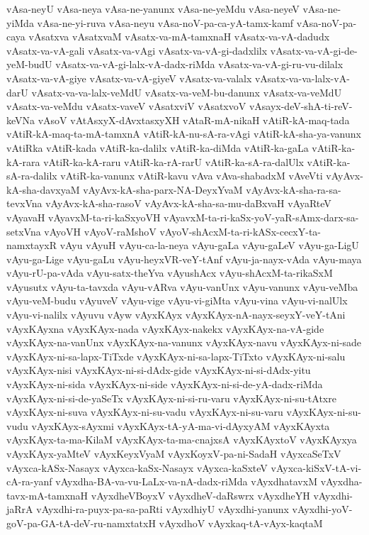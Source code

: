 {vAsa-neyU
vAsa-neya
vAsa-ne-yanunx
vAsa-ne-yeMdu
vAsa-neyeV
vAsa-ne-yiMda
vAsa-ne-yi-ruva
vAsa-neyu
vAsa-noV-pa-ca-yA-tamx-kamf
vAsa-noV-pa-caya
vAsatxva
vAsatxvaM
vAsatx-va-mA-tamxnaH
vAsatx-va-vA-dadudx
vAsatx-va-vA-gali
vAsatx-va-vAgi
vAsatx-va-vA-gi-dadxlilx
vAsatx-va-vA-gi-de-yeM-budU
vAsatx-va-vA-gi-lalx-vA-dadx-riMda
vAsatx-va-vA-gi-ru-vu-dilalx
vAsatx-va-vA-giye
vAsatx-va-vA-giyeV
vAsatx-va-valalx
vAsatx-va-va-lalx-vA-darU
vAsatx-va-va-lalx-veMdU
vAsatx-va-veM-bu-danunx
vAsatx-va-veMdU
vAsatx-va-veMdu
vAsatx-vaveV
vAsatxviV
vAsatxvoV
vAsayx-deV-shA-ti-reV-keVNa
vAsoV
vAtAsxyX-dAvxtasxyXH
vAtaR-mA-nikaH
vAtiR-kA-maq-tada
vAtiR-kA-maq-ta-mA-tamxnA
vAtiR-kA-nu-sA-ra-vAgi
vAtiR-kA-sha-ya-vanunx
vAtiRka
vAtiR-kada
vAtiR-ka-dalilx
vAtiR-ka-diMda
vAtiR-ka-gaLa
vAtiR-ka-kA-rara
vAtiR-ka-kA-raru
vAtiR-ka-rA-rarU
vAtiR-ka-sA-ra-dalUlx
vAtiR-ka-sA-ra-dalilx
vAtiR-ka-vanunx
vAtiR-kavu
vAva
vAva-shabadxM
vAveVti
vAyAvx-kA-sha-davxyaM
vAyAvx-kA-sha-parx-NA-DeyxYvaM
vAyAvx-kA-sha-ra-sa-tevxVna
vAyAvx-kA-sha-rasoV
vAyAvx-kA-sha-sa-mu-daBxvaH
vAyaRteV
vAyavaH
vAyavxM-ta-ri-kaSxyoVH
vAyavxM-ta-ri-kaSx-yoV-yaR-sAmx-darx-sa-setxVna
vAyoVH
vAyoV-raMshoV
vAyoV-shAcxM-ta-ri-kASx-cecxY-ta-namxtayxR
vAyu
vAyuH
vAyu-ca-la-neya
vAyu-gaLa
vAyu-gaLeV
vAyu-ga-LigU
vAyu-ga-Lige
vAyu-gaLu
vAyu-heyxVR-veY-tAnf
vAyu-ja-nayx-vAda
vAyu-maya
vAyu-rU-pa-vAda
vAyu-satx-theYva
vAyushAcx
vAyu-shAcxM-ta-rikaSxM
vAyusutx
vAyu-ta-tavxda
vAyu-vARva
vAyu-vanUnx
vAyu-vanunx
vAyu-veMba
vAyu-veM-budu
vAyuveV
vAyu-vige
vAyu-vi-giMta
vAyu-vina
vAyu-vi-nalUlx
vAyu-vi-nalilx
vAyuvu
vAyw
vAyxKAyx
vAyxKAyx-nA-nayx-seyxY-veY-tAni
vAyxKAyxna
vAyxKAyx-nada
vAyxKAyx-nakekx
vAyxKAyx-na-vA-gide
vAyxKAyx-na-vanUnx
vAyxKAyx-na-vanunx
vAyxKAyx-navu
vAyxKAyx-ni-sade
vAyxKAyx-ni-sa-lapx-TiTxde
vAyxKAyx-ni-sa-lapx-TiTxto
vAyxKAyx-ni-salu
vAyxKAyx-nisi
vAyxKAyx-ni-si-dAdx-gide
vAyxKAyx-ni-si-dAdx-yitu
vAyxKAyx-ni-sida
vAyxKAyx-ni-side
vAyxKAyx-ni-si-de-yA-dadx-riMda
vAyxKAyx-ni-si-de-yaSeTx
vAyxKAyx-ni-si-ru-varu
vAyxKAyx-ni-su-tAtxre
vAyxKAyx-ni-suva
vAyxKAyx-ni-su-vadu
vAyxKAyx-ni-su-varu
vAyxKAyx-ni-su-vudu
vAyxKAyx-sAyxmi
vAyxKAyx-tA-yA-ma-vi-dAyxyAM
vAyxKAyxta
vAyxKAyx-ta-ma-KilaM
vAyxKAyx-ta-ma-cnajxsA
vAyxKAyxtoV
vAyxKAyxya
vAyxKAyx-yaMteV
vAyxKeyxVyaM
vAyxKoyxV-pa-ni-SadaH
vAyxcaSeTxV
vAyxca-kASx-Nasayx
vAyxca-kaSx-Nasayx
vAyxca-kaSxteV
vAyxca-kiSxV-tA-vi-cA-ra-yanf
vAyxdha-BA-va-vu-LaLx-va-nA-dadx-riMda
vAyxdhatavxM
vAyxdha-tavx-mA-tamxnaH
vAyxdheVBoyxV
vAyxdheV-daRswrx
vAyxdheYH
vAyxdhi-jaRrA
vAyxdhi-ra-puyx-pa-sa-paRti
vAyxdhiyU
vAyxdhi-yanunx
vAyxdhi-yoV-goV-pa-GA-tA-deV-ru-namxtatxH
vAyxdhoV
vAyxkaq-tA-vAyx-kaqtaM
}
